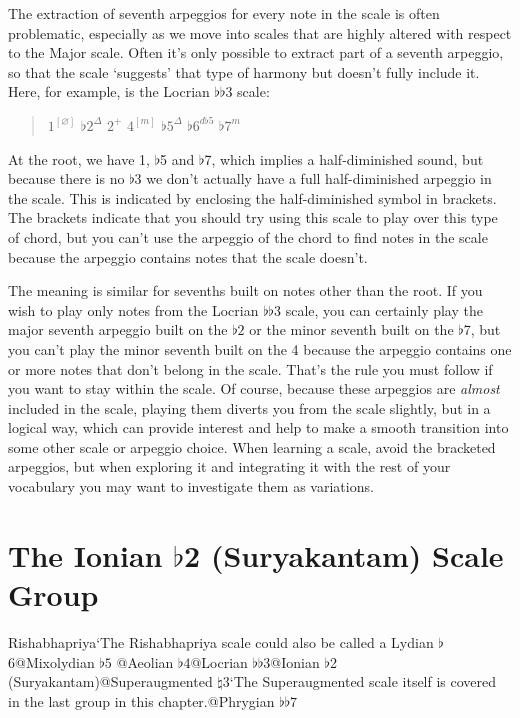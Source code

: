 \documentclass[english]{./gbook}
\begin{document}
\begin{large}
The extraction of seventh arpeggios for every note in the scale is often problematic, especially as we move into scales that are highly altered with respect to the Major scale. Often it's only possible to extract part of a seventh arpeggio, so that the scale `suggests' that type of harmony but doesn't fully include it. Here, for example, is the Locrian $\flat\flat$3 scale:
\begin{quote}
$1^{[\varnothing]}$ $\flat 2^{\Delta}$ $2^{+}$ $4^{[m]}$ $\flat 5^{\Delta}$ $\flat 6^{d\flat 5}$ $\flat 7^{m}$
\end{quote}
At the root, we have 1, $\flat$5 and $\flat$7, which implies a half-diminished sound, but because there is no $\flat$3 we don't actually have a full half-diminished arpeggio in the scale. This is indicated by enclosing the half-diminished symbol in brackets. The brackets indicate that you should try using this scale to play over this type of chord, but you can't use the arpeggio of the chord to find notes in the scale because the arpeggio contains notes that the scale doesn't.

The meaning is similar for sevenths built on notes other than the root. If you wish to play only notes from the Locrian $\flat\flat$3 scale, you can certainly play the major seventh arpeggio built on the $\flat 2$ or the minor seventh built on the $\flat$7, but you can't play the minor seventh built on the 4 because the arpeggio contains one or more notes that don't belong in the scale. That's the rule you must follow if you want to stay within the scale. Of course, because these arpeggios are \emph{almost} included in the scale, playing them diverts you from the scale slightly, but in a logical way, which can provide interest and help to make a smooth transition into some other scale or arpeggio choice. When learning a scale, avoid the bracketed arpeggios, but when exploring it and integrating it with the rest of your vocabulary you may want to investigate them as variations.

\section{The Ionian $\flat$2 (Suryakantam) Scale Group}
Rishabhapriya`The Rishabhapriya scale could also be called a Lydian $\flat$6@Mixolydian $\flat 5$
@Aeolian $\flat 4$@Locrian $\flat\flat 3$@Ionian $\flat$2 (Suryakantam)@Superaugmented $\natural$3`The Superaugmented scale itself is covered in the last group in this chapter.@Phrygian $\flat\flat 7$%



\end{large}
\end{document}
